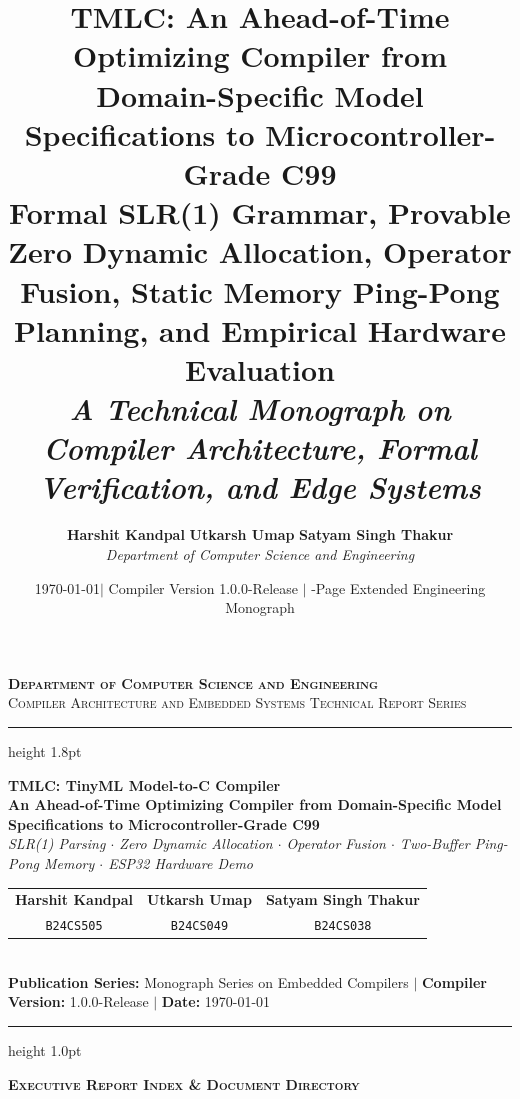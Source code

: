 \documentclass[11pt,a4paper]{article}
\title{
    \vspace{-1.5cm}
    \textbf{\huge TMLC: An Ahead-of-Time Optimizing Compiler from Domain-Specific Model Specifications to Microcontroller-Grade C99} \\[0.6em]
    \large\textbf{Formal SLR(1) Grammar, Provable Zero Dynamic Allocation, Operator Fusion, Static Memory Ping-Pong Planning, and Empirical Hardware Evaluation} \\[0.4em]
    \normalsize\textit{A Technical Monograph on Compiler Architecture, Formal Verification, and Edge Systems}
}
\author{
    \textbf{Harshit Kandpal} \qquad \textbf{Utkarsh Umap} \qquad \textbf{Satyam Singh Thakur} \\[0.4em]
    \textit{Department of Computer Science and Engineering}
}
\date{\today \quad $\vert$ \quad Compiler Version 1.0.0-Release \quad $\vert$ \quad 40-Page Extended Engineering Monograph}
\begin{document}
\begin{titlepage}
\thispagestyle{empty}
\begin{center}
    {\large \textsc{\textbf{Department of Computer Science and Engineering}}}\\[0.25em]
    {\normalsize \textsc{Compiler Architecture and Embedded Systems Technical Report Series}}\\[0.6em]
    \hrule height 1.8pt
    \vspace{0.8em}
    
    {\Huge \textbf{TMLC: TinyML Model-to-C Compiler}}\\[0.45em]
    {\large \textbf{An Ahead-of-Time Optimizing Compiler from Domain-Specific Model Specifications to Microcontroller-Grade C99}}\\[0.35em]
    {\small \textit{SLR(1) Parsing $\cdot$ Zero Dynamic Allocation $\cdot$ Operator Fusion $\cdot$ Two-Buffer Ping-Pong Memory $\cdot$ ESP32 Hardware Demo}}\\[1.1em]
    
    \begin{tabular}{ccc}
        \textbf{Harshit Kandpal} & \textbf{Utkarsh Umap} & \textbf{Satyam Singh Thakur} \\
        \texttt{B24CS505} & \texttt{B24CS049} & \texttt{B24CS038} \\
    \end{tabular}\\[0.65em]
    {\footnotesize \textbf{Publication Series:} Monograph Series on Embedded Compilers \quad $\vert$ \quad \textbf{Compiler Version:} 1.0.0-Release \quad $\vert$ \quad \textbf{Date:} \today}
\end{center}

\vspace{0.5em}
\hrule height 1.0pt
\vspace{0.8em}

\begin{center}
    {\large \textbf{\textsc{Executive Report Index \& Document Directory}}}
\end{center}
\vspace{0.2em}


\end{titlepage}
\end{document}

